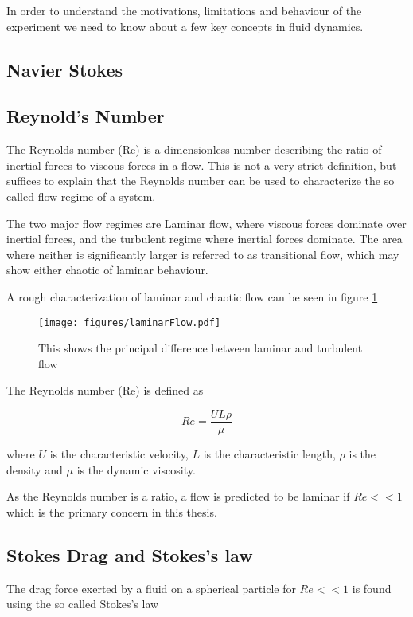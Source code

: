 
In order to understand the motivations, limitations and behaviour of the experiment we need to know about a few key concepts in fluid dynamics.

\subsection{Navier Stokes}


\subsection{Reynold's Number}
The Reynolds number (Re) is a dimensionless number describing the ratio of inertial forces to viscous forces in a flow. This is not a very strict definition, but suffices to explain that the Reynolds number can be used to characterize the so called flow regime of a system. 

The two major flow regimes are Laminar flow, where viscous forces dominate over inertial forces, and the turbulent regime where inertial forces dominate. The area where neither is significantly larger is referred to as transitional flow, which may show either chaotic of laminar behaviour. 

A rough characterization of laminar and chaotic flow can be seen in figure \ref{fig:laminar_flow}

\begin{figure}
\centering
\texttt{[image: figures/laminarFlow.pdf]}
\caption{This shows the principal difference between laminar and turbulent flow}
\label{fig:laminar_flow}
\end{figure}

The Reynolds number (Re) is defined as \cite{introfluid}

\begin{equation}\label{eq:reynolds}
Re = \frac{U L \rho}{\mu}
\end{equation}

where $U$ is the characteristic velocity, $L$ is the characteristic length, $\rho$ is the density and $\mu$ is the dynamic viscosity. 

As the Reynolds number is a ratio, a flow is predicted to be laminar if $Re << 1$ which is the primary concern in this thesis.

\subsection{Stokes Drag and Stokes's law}
The drag force exerted by a fluid on a spherical particle for $Re << 1$ is found using the so called Stokes's law \cite{introfluid2}

